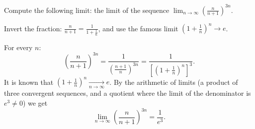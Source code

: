 
\begin{question}
Compute the following limit:
the limit of the sequence $\displaystyle \lim_{n\to\infty}\left(\frac{n}{n+1}\right)^{3n}$.
\end{question}

\begin{hint}
Invert the fraction: $\frac{n}{n+1}=\frac{1}{1+\frac1n}$, and use the famous limit $\left(1+\frac1n\right)^n\to e$.
\end{hint}

\begin{solution}
For every $n$:
\[ \left(\frac{n}{n+1}\right)^{3n}=\frac{1}{\left(\frac{n+1}{n}\right)^{3n}}=\frac{1}{\left[\left(1+\frac1n\right)^{n}\right]^{3}}. \]
It is known that $\left(1+\frac1n\right)^n\xrightarrow[n\to\infty]{} e$. By the arithmetic of limits (a product of three convergent sequences, and a quotient where the limit of the denominator is $e^3\neq 0$) we get
\[ \lim_{n\to\infty}\left(\frac{n}{n+1}\right)^{3n}=\frac{1}{e^3}. \]
\end{solution}
